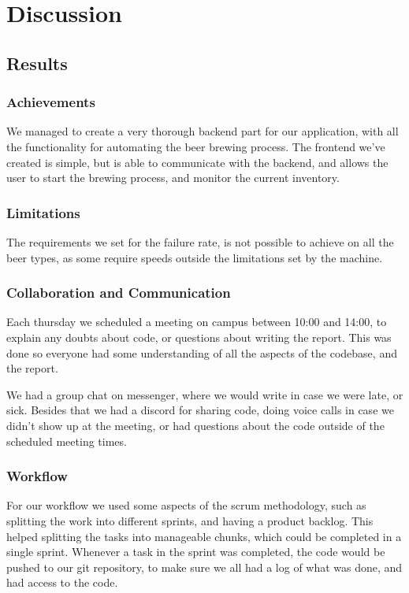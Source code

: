 \section{Discussion}

\subsection{Results}
\subsubsection{Achievements}
We managed to create a very thorough backend part for our application,
with all the functionality for automating the beer brewing process.
The frontend we've created is simple, but is able to communicate with the backend,
and allows the user to start the brewing process, and monitor the current inventory.

\subsubsection{Limitations}
The requirements we set for the failure rate,
is not possible to achieve on all the beer types,
as some require speeds outside the limitations set by the machine.

\subsubsection{Collaboration and Communication}
Each thursday we scheduled a meeting on campus between 10:00 and 14:00,
to explain any doubts about code, or questions about writing the report.
This was done so everyone had some understanding of all the aspects 
of the codebase, and the report.


We had a group chat on messenger, where we would write in case we were late,
or sick.
Besides that we had a discord for sharing code, doing voice calls in case 
we didn't show up at the meeting, or had questions about the code 
outside of the scheduled meeting times.

\subsubsection{Workflow}
For our workflow we used some aspects of the scrum methodology, such as splitting the work into different sprints, and having a product backlog.
This helped splitting the tasks into manageable chunks, which could be completed in a single sprint.
Whenever a task in the sprint was completed, the code would be pushed to our git repository,
to make sure we all had a log of what was done, and had access to the code.

